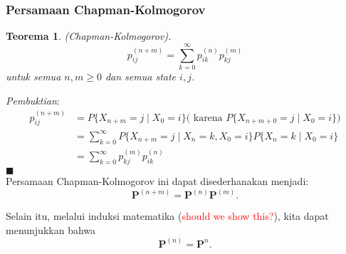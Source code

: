 \documentclass[11pt,b5paper,twoside]{book}
\newcommand{\qed}{\hfill$\blacksquare$}
\newtheorem{theorem}{Teorema}[section]
\begin{document}
	
		\subsubsection{Persamaan Chapman-Kolmogorov}
			
			\begin{theorem}(Chapman-Kolmogorov).
				\begin{equation}
				p_{ij}^{(n+m)}=\sum_{k=0}^{\infty}p_{ik}^{(n)}p_{kj}^{(m)}
				\end{equation}
				untuk semua $n,m \geq 0$ dan semua state $i,j$.
			\end{theorem}
		\noindent \textit{Pembuktian}:\\
			\begin{equation*}
			\begin{aligned}
				  p_{ij}^{(n+m)} &= P\{ X_{n+m} = j \mid X_0 = i\}		\text{(			karena } P\{ X_{n+m+0} = j \mid X_0 = i\}\text{)}\\
				  &= \sum_{k=0}^{\infty} P\{ X_{n+m} = j \mid X_n = k,X_0 = i\} P\{X_n = k \mid X_0 = i\}\\
				  &= \sum_{k=0}^{\infty} p_{kj}^{(m)}p_{ik}^{(n)}
			\end{aligned}
			\end{equation*}
		\qed\\
		
		
		\noindent Persamaan Chapman-Kolmogorov ini dapat disederhanakan menjadi:
		$$
		\mathbf{P}^{(n+m)} = \mathbf{P}^{(n)}\mathbf{P}^{(m)}.
		$$	
		
		\noindent Selain itu, melalui induksi matematika (\textcolor{red}{should we show this?}), kita dapat menunjukkan bahwa 
		$$
		\mathbf{P}^{(n)} = \mathbf{P}^n.
		$$
		
\end{document}
